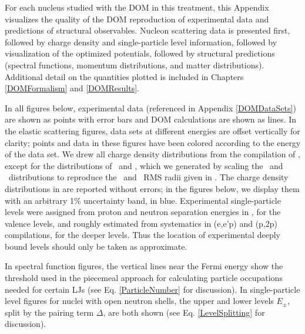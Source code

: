 For each nucleus studied with the DOM in this treatment, this Appendix
visualizes the quality of the DOM reproduction of experimental data and
predictions of structural observables. Nucleon scattering data is presented
first, followed by charge density and single-particle level information,
followed by visualization of the optimized potentials, followed by structural
predictions (spectral functions, momentum distributions, and matter
distributions). Additional detail on the quantities plotted is included in
Chapters \ref{DOMFormalism} and \ref{DOMResults}.

In all figures below, experimental data (referenced in Appendix \ref{DOMDataSets}) are shown
as points with error bars and DOM calculations are shown as lines. In
the elastic scattering figures, data sets at different energies are offset
vertically for clarity; points and data in these figures have been colored
according to the energy of the data set. We drew all charge density distributions
from the compilation of \cite{DeVries1987}, except for the distributions of
\oEight\ and \snTwelve, which we generated by scaling the \oSix\ and \snFour\
distributions to reproduce the \oEight\ and \snTwelve\ RMS radii given in
\cite{DeVries1987}. The charge density distributions in \cite{DeVries1987} 
are reported without
errors; in the figures below, we display them with an arbitrary 1\% uncertainty
band, in blue. Experimental
single-particle levels were assigned from proton and neutron separation energies
in \cite{AME2016}, for the valence levels,
and roughly estimated from systematics in (e,e'p) and (p,2p) compilations, for the deeper
levels. Thus the location of experimental deeply bound levels should only be
taken as approximate.

In spectral function figures, the vertical lines near the Fermi energy show the threshold 
used in the piecemeal approach for calculating particle occupations needed for certain LJs
(see Eq. \ref{ParticleNumber} for discussion). In single-particle level figures for nuclei with open
neutron shells, the upper and lower levels $E_{\pm}$, split by the pairing term $\Delta$,
are both shown (see Eq. \ref{LevelSplitting} for discussion).

